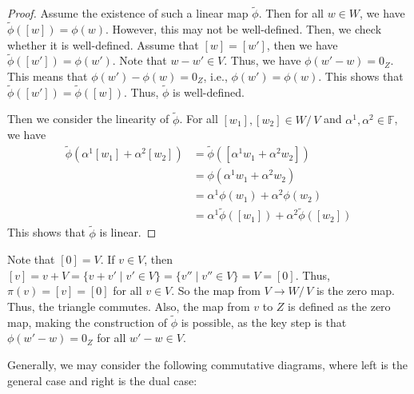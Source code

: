 \documentclass[
	11pt, %
	fleqn, %
	a4paper, %
]{LegrandOrangeBook}
\renewcommand{\ker}[1]{\mathsf{Ker}(#1)} %
\renewcommand{\Im}[1]{\mathsf{Im}(#1)} %
\newcommand{\quotient}[2]{#1/\, #2} %
\newcommand{\F}{\mathbb{F}} %
\newcommand{\coker}[1]{\mathsf{Coker}(#1)} %
\newcommand{\coim}[1]{\mathsf{Coim}(#1)} %
\begin{document}
\begin{proof}
    Assume the existence of such a linear map $\tilde{\phi}$. Then for all $w \in W$, we have $\tilde{\phi}([w]) = \phi(w)$. However, this may not be well-defined. Then, we check whether it is well-defined. Assume that $[w] = [w']$, then we have $\tilde{\phi}([w']) = \phi(w')$. Note that $w - w' \in V$. Thus, we have $\phi(w' - w) = 0_Z$. This means that $\phi(w') - \phi(w) = 0_Z$, i.e., $\phi(w') = \phi(w)$. This shows that $\tilde{\phi}([w']) = \tilde{\phi}([w])$. Thus, $\tilde{\phi}$ is well-defined.

    Then we consider the linearity of $\tilde{\phi}$. For all $[w_1], [w_2] \in \quotient{W}{V}$ and $\alpha^1, \alpha^2 \in \F$, we have
    \[
        \begin{split}
            \tilde{\phi}(\alpha^1 [w_1] + \alpha^2 [w_2]) &= \tilde{\phi}([\alpha^1 w_1 + \alpha^2 w_2]) \\
            &= \phi(\alpha^1 w_1 + \alpha^2 w_2) \\
            &= \alpha^1 \phi(w_1) + \alpha^2 \phi(w_2) \\
            &= \alpha^1 \tilde{\phi}([w_1]) + \alpha^2 \tilde{\phi}([w_2])
        \end{split}
    \]
    This shows that $\tilde{\phi}$ is linear.
\end{proof}
\begin{remark}
    Note that $[0] = V$. If $v \in V$, then $[v] = v + V = \{v + v' \mid v' \in V\} = \{v'' \mid v'' \in V\} = V = [0]$. Thus, $\pi(v) = [v] = [0]$ for all $v \in V$. So the map from $V \to \quotient{W}{V}$ is the zero map. Thus, the triangle commutes. Also, the map from $v$ to $Z$ is defined as the zero map, making the construction of $\tilde{\phi}$ is possible, as the key step is that $\phi(w' - w) = 0_Z$ for all $w' - w \in V$.
\end{remark}

Generally, we may consider the following commutative diagrams, where left is the general case and right is the dual case:

\begin{center}
\end{center}
\end{document}
